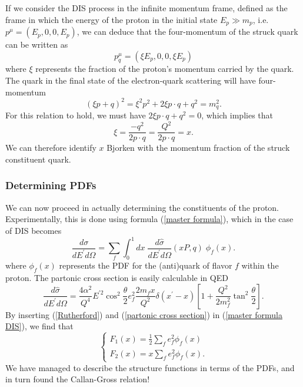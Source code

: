 \documentclass[10pt,a4paper]{book}
\begin{document}
If we consider the DIS process in the infinite momentum frame, defined as the frame in which the energy of the proton in the initial state $E_p \gg m_p$, i.e. $p^\mu = (E_p, 0, 0, E_p)$, we can deduce that the four-momentum of the struck quark can be written as
\begin{equation}
p^\mu_q = (\xi E_p, 0, 0, \xi E_p)
\end{equation}
where $\xi$ represents the fraction of the proton's momentum carried by the quark. The quark in the final state of the electron-quark scattering will have four-momentum
\begin{equation}
\left(\xi p + q \right)^2 = \xi^2 p^2 + 2\xi p \cdot q + q^2 = m_q^2.
\end{equation}
For this relation to hold, we must have $2\xi p \cdot q + q^2 = 0$, which implies that
\begin{equation}
\xi = \frac{-q^2}{2 p \cdot q} = \frac{Q^2}{2 p \cdot q} = x.
\end{equation}
We can therefore identify $x$ Bjorken with the momentum fraction of the struck constituent quark.

\subsubsection{Determining PDFs}
We can now proceed in actually determining the constituents of the proton. Experimentally, this is done using formula (\ref{master formula}), which in the case of DIS becomes
\begin{equation}
\frac{d\sigma}{dE^\prime d\Omega} = \sum_f \int_0^1 dx \; \frac{d\hat{\sigma}}{dE^\prime d\Omega}(xP, q) \; \phi_f(x).
\label{master formula DIS}
\end{equation}
where $\phi_f(x)$ represents the PDF for the (anti)quark of flavor $f$ within the proton. The partonic cross section is easily calculable in QED
\begin{equation}
\frac{d\hat{\sigma}}{dE^\prime d\Omega} = \frac{4\alpha^2}{Q^4}E^{\prime 2}\cos^2 \frac{\theta}{2}e_f^2 \frac{2m_fx}{Q^2}\delta \left(x^\prime - x\right) \left[1 + \frac{Q^2}{2m_f^2}\tan^2\frac{\theta}{2}  \right].
\label{partonic cross section}
\end{equation}
By inserting (\ref{Rutherford}) and (\ref{partonic cross section}) in (\ref{master formula DIS}), we find that
\begin{equation}
\begin{cases}
F_1 (x) = \frac{1}{2} \sum_f e_f^2 \phi_f (x) \\
F_2 (x) = x \sum_f e_f^2 \phi_f (x).
\label{Structure functions PDFs}
\end{cases}
\end{equation}
We have managed to describe the structure functions in terms of the PDFs, and in turn found the Callan-Gross relation!
\end{document}
